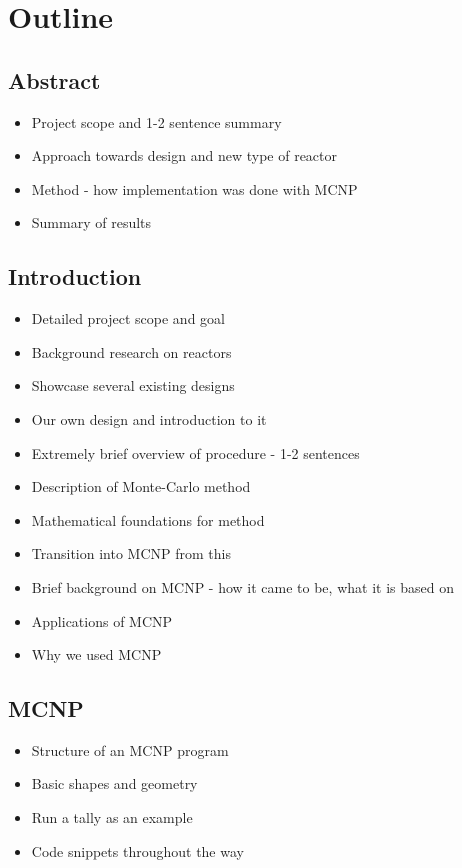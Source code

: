 \documentclass[12pt,a4paper]{article}
\begin{document}
\section*{Outline}
\renewcommand{\thesubsection}{\arabic{subsection}}
\subsection{Abstract}
\begin{itemize}
	\item Project scope and 1-2 sentence summary
	\item Approach towards design and new type of reactor
	\item Method - how implementation was done with MCNP
	\item Summary of results
\end{itemize}
\subsection{Introduction}
\begin{itemize}
	\item Detailed project scope and goal
	\item Background research on reactors
	\item Showcase several existing designs
	\item Our own design and introduction to it
	\item Extremely brief overview of procedure - 1-2 sentences
	\item Description of Monte-Carlo method
	\item Mathematical foundations for method
	\item Transition into MCNP from this
	\item Brief background on MCNP - how it came to be, what it is based on
	\item Applications of MCNP
	\item Why we used MCNP
\end{itemize}
\subsection{MCNP}
\begin{itemize}
	\item Structure of an MCNP program
	\item Basic shapes and geometry
	\item Run a tally as an example
	\item Code snippets throughout the way
\end{itemize}
\end{document}
